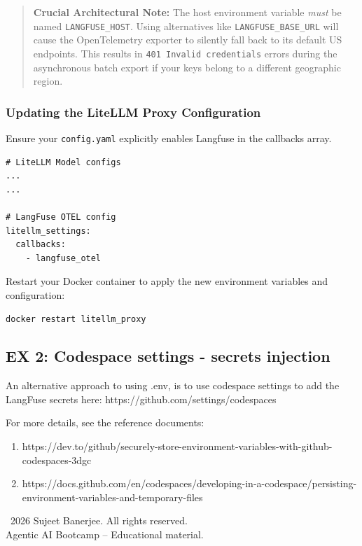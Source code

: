 \documentclass[12pt,a4paper]{article}
\begin{document}
\begin{quote}
\textbf{Crucial Architectural Note:} The host environment variable \textit{must} be named \texttt{LANGFUSE\_HOST}. Using alternatives like \texttt{LANGFUSE\_BASE\_URL} will cause the OpenTelemetry exporter to silently fall back to its default US endpoints. This results in \texttt{401 Invalid credentials} errors during the asynchronous batch export if your keys belong to a different geographic region.
\end{quote}

\subsubsection{Updating the LiteLLM Proxy Configuration}
Ensure your \texttt{config.yaml} explicitly enables Langfuse in the callbacks array.

\begin{verbatim}
# LiteLLM Model configs
...
...

# LangFuse OTEL config
litellm_settings:
  callbacks:
    - langfuse_otel
\end{verbatim}

Restart your Docker container to apply the new environment variables and configuration:
\begin{verbatim}
docker restart litellm_proxy
\end{verbatim}

\subsection{EX 2: Codespace settings - secrets injection}
An alternative approach to using .env, is to use codespace settings to add the LangFuse secrets here: https://github.com/settings/codespaces

For more details, see the reference documents:
\begin{enumerate}
    \item https://dev.to/github/securely-store-environment-variables-with-github-codespaces-3dgc
    \item https://docs.github.com/en/codespaces/developing-in-a-codespace/persisting-environment-variables-and-temporary-files 
\end{enumerate}



\vfill
\begin{center}\small
\textcopyright\ 2026 Sujeet Banerjee. All rights reserved.\\
Agentic AI Bootcamp -- Educational material.
\end{center}
\end{document}
